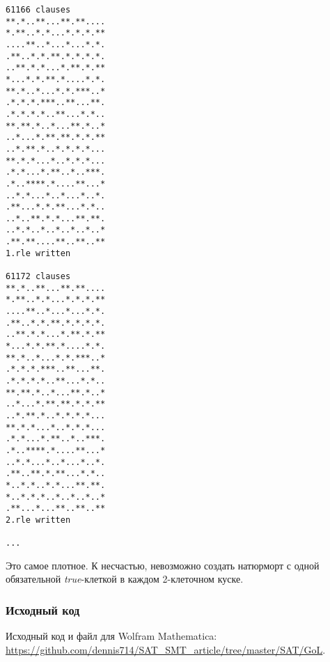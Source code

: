 \begin{lstlisting}
61166 clauses
**.*..**...**.**....
*.**..*.*...*.*.*.**
....**..*...*...*.*.
.**..*.*.**.*.*.*.*.
..**.*.*...*.**.*.**
*...*.*.**.*....*.*.
**.*..*...*.*.***..*
.*.*.*.***..**...**.
.*.*.*.*..**...*.*..
**.**.*..*...**.*..*
..*...*.**.**.*.*.**
..*.**.*..*.*.*.*...
**.*.*...*..*.*.*...
.*.*...*.**..*..***.
.*..****.*....**...*
..*.*...*..*...*..*.
.**...*.*.**...*.*..
..*..**.*.*...**.**.
..*.*..*..*..*..*..*
.**.**....**..**..**
1.rle written

61172 clauses
**.*..**...**.**....
*.**..*.*...*.*.*.**
....**..*...*...*.*.
.**..*.*.**.*.*.*.*.
..**.*.*...*.**.*.**
*...*.*.**.*....*.*.
**.*..*...*.*.***..*
.*.*.*.***..**...**.
.*.*.*.*..**...*.*..
**.**.*..*...**.*..*
..*...*.**.**.*.*.**
..*.**.*..*.*.*.*...
**.*.*...*..*.*.*...
.*.*...*.**..*..***.
.*..****.*....**...*
..*.*...*..*...*..*.
.**..**.*.**...*.*..
*..*.*..*.*...**.**.
*..*.*.*..*..*..*..*
.**...*...**..**..**
2.rle written

...

\end{lstlisting}

Это самое плотное. К несчастью, невозможно создать натюрморт с одной обязательной 
\textit{true}-клеткой в каждом 2-клеточном куске.

\subsubsection{Исходный код}

Исходный код и файл для Wolfram Mathematica: \url{https://github.com/dennis714/SAT_SMT_article/tree/master/SAT/GoL}.

